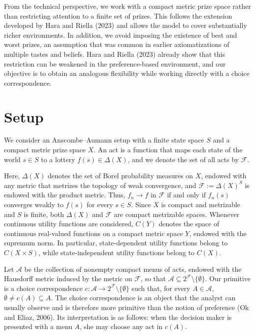 \documentclass[11pt]{article}
\begin{document}
From the technical perspective, we work with a compact metric prize space rather than restricting attention to a finite set of prizes. This follows the extension developed by Hara and Riella (2023) and allows the model to cover substantially richer environments. In addition, we avoid imposing the existence of best and worst prizes, an assumption that was common in earlier axiomatizations of multiple tastes and beliefs. Hara and Riella (2023) already show that this restriction can be weakened in the preference-based environment, and our objective is to obtain an analogous flexibility while working directly with a choice correspondence.

\section{Setup} \label{sec:result}

We consider an Anscombe--Aumann setup with a finite state space $S$ and a compact metric prize space $X$. An act is a function that maps each state of the world $s\in S$ to a lottery $f(s)\in\Delta(X)$, and we denote the set of all acts by $\mathcal{F}$.

Here, $\Delta(X)$ denotes the set of Borel probability measures on $X$, endowed with any metric that metrizes the topology of weak convergence, and $\mathcal{F}:=\Delta(X)^S$ is endowed with the product metric. Thus, $f_n\to f$ in $\mathcal{F}$ if and only if $f_n(s)$ converges weakly to $f(s)$ for every $s\in S$. Since $X$ is compact and metrizable and $S$ is finite, both $\Delta(X)$ and $\mathcal{F}$ are compact metrizable spaces. Whenever continuous utility functions are considered, $C(Y)$ denotes the space of continuous real-valued functions on a compact metric space $Y$, endowed with the supremum norm. In particular, state-dependent utility functions belong to $C(X\times S)$, while state-independent utility functions belong to $C(X)$.

Let $\mathcal{A}$ be the collection of nonempty compact menus of acts, endowed with the Hausdorff metric induced by the metric on $\mathcal{F}$, so that $\mathcal{A}\subseteq 2^{\mathcal{F}}\setminus\{\emptyset\}$. Our primitive is a choice correspondence $c\colon\mathcal{A}\to 2^{\mathcal{F}}\setminus\{\emptyset\}$ such that, for every $A\in\mathcal{A}$, $\emptyset\neq c(A)\subseteq A$. The choice correspondence is an object that the analyst can usually observe and is therefore more primitive than the notion of preference (Ok and Eliaz, 2006). Its interpretation is as follows: when the decision maker is presented with a menu $A$, she may choose any act in $c(A)$.
\end{document}
